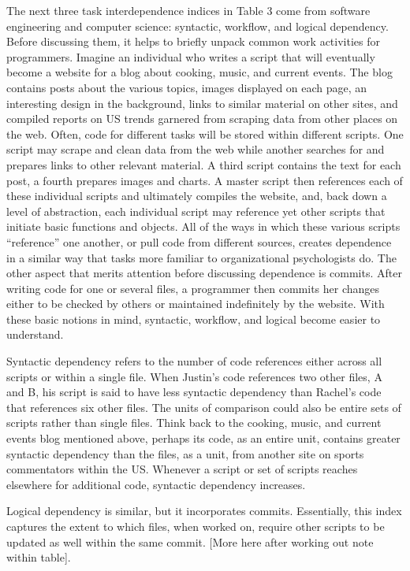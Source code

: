 \documentclass[english,,man]{apa6}
\theoremstyle{definition}
\theoremstyle{definition}
\theoremstyle{definition}
\theoremstyle{remark}
\begin{document}
The next three task interdependence indices in Table 3 come from
software engineering and computer science: syntactic, workflow, and
logical dependency. Before discussing them, it helps to briefly unpack
common work activities for programmers. Imagine an individual who writes
a script that will eventually become a website for a blog about cooking,
music, and current events. The blog contains posts about the various
topics, images displayed on each page, an interesting design in the
background, links to similar material on other sites, and compiled
reports on US trends garnered from scraping data from other places on
the web. Often, code for different tasks will be stored within different
scripts. One script may scrape and clean data from the web while another
searches for and prepares links to other relevant material. A third
script contains the text for each post, a fourth prepares images and
charts. A master script then references each of these individual scripts
and ultimately compiles the website, and, back down a level of
abstraction, each individual script may reference yet other scripts that
initiate basic functions and objects. All of the ways in which these
various scripts \enquote{reference} one another, or pull code from
different sources, creates dependence in a similar way that tasks more
familiar to organizational psychologists do. The other aspect that
merits attention before discussing dependence is commits. After writing
code for one or several files, a programmer then commits her changes
either to be checked by others or maintained indefinitely by the
website. With these basic notions in mind, syntactic, workflow, and
logical become easier to understand.

Syntactic dependency refers to the number of code references either
across all scripts or within a single file. When Justin's code
references two other files, A and B, his script is said to have less
syntactic dependency than Rachel's code that references six other files.
The units of comparison could also be entire sets of scripts rather than
single files. Think back to the cooking, music, and current events blog
mentioned above, perhaps its code, as an entire unit, contains greater
syntactic dependency than the files, as a unit, from another site on
sports commentators within the US. Whenever a script or set of scripts
reaches elsewhere for additional code, syntactic dependency increases.

Logical dependency is similar, but it incorporates commits. Essentially,
this index captures the extent to which files, when worked on, require
other scripts to be updated as well within the same commit. {[}More here
after working out note within table{]}.
\end{document}
